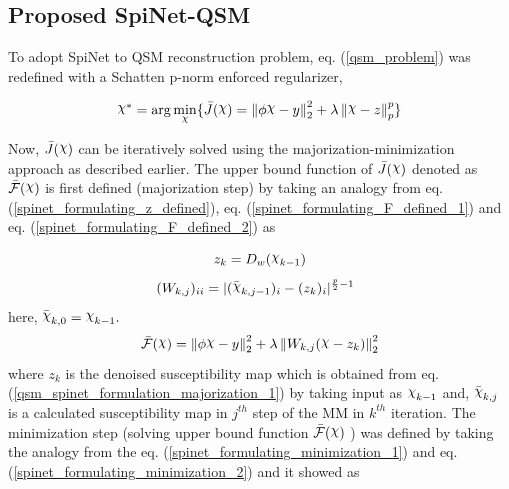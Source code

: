 \documentclass[sn-vancouver,Numbered]{sn-jnl}%
\DeclareRobustCommand{\rchi}{{\mathpalette\irchi\relax}}
\newcommand{\irchi}[2]{\raisebox{\depth}{$#1\chi$}}
\begin{document}
\subsection{Proposed SpiNet-QSM}

To adopt SpiNet to QSM reconstruction problem, eq. (\ref{qsm_problem}) was redefined with a Schatten p-norm enforced regularizer,  


\begin{equation}
    \label{qsm_spinet_formulation_1}
\rchi^{*}= \arg \min_{\rchi}  \{\bar{J}(\rchi)=\left \| \phi \rchi - y\right \|_{2}^{2}+\lambda \left \| \rchi -z \right \|_{p}^{p}\}
\end{equation}

\noindent Now, $\bar{J}(\rchi)$ can be iteratively solved using the majorization-minimization approach as described earlier. The upper bound function of $\bar{J}(\rchi)$ denoted as $\bar{\mathcal{F}}(\rchi)$ is first defined (majorization step) by taking an analogy from  eq. (\ref{spinet_formulating_z_defined}), eq. (\ref{spinet_formulating_F_defined_1}) and eq. (\ref{spinet_formulating_F_defined_2}) as

\begin{equation}
\label{qsm_spinet_formulation_majorization_1}
z_k=D_w(\rchi_{k-1})
\end{equation}
\vspace{-1mm}
\begin{equation}
\label{qsm_spinet_formulation_majorization_3}
    (W_{k,j})_{ii}=|(\bar{\rchi}_{k,j-1})_{i}-(z_{k})_{i}|^{\frac{p}{2}-1} \\ \hspace{2mm} 
\end{equation}
here, $\bar{\rchi}_{k,0}=\rchi_{k-1}.$
\begin{equation}
\label{qsm_spinet_formulation_majorization_2}
 \bar{\mathcal{F}}(\rchi)=\left \| \phi \rchi - y\right \|_{2}^{2}+\lambda \left \| W_{k,j}(\rchi -z_{k}) \right \|_{2}^{2} 
\end{equation}
\noindent where $z_{k}$ is the denoised susceptibility map which is obtained from eq. (\ref{qsm_spinet_formulation_majorization_1}) by taking input as $\rchi_{k-1}$ and, $\bar\rchi_{k,j}$ is a calculated susceptibility map in $j^{th}$ step of the MM in $k^{th}$ iteration. The minimization step (solving upper bound function $\bar{\mathcal{F}}(\rchi)$ ) was defined by taking the analogy from the eq. (\ref{spinet_formulating_minimization_1}) and eq. (\ref{spinet_formulating_minimization_2}) and it showed as
\end{document}
